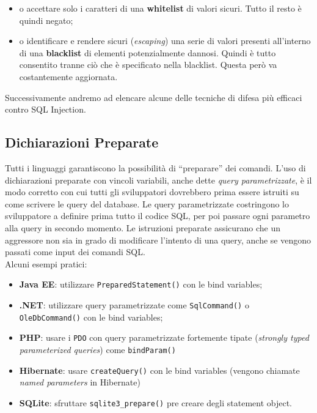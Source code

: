 \begin{itemize}
    \item o accettare solo i caratteri di una \textbf{whitelist} di valori sicuri.
          Tutto il resto è quindi negato;
    \item o identificare e rendere sicuri (\textit{escaping}) una serie di valori
          presenti all'interno di una \textbf{blacklist} di elementi
          potenzialmente dannosi. Quindi è
          tutto consentito tranne ciò che è specificato nella blacklist.
          Questa però va
          costantemente aggiornata.
\end{itemize}

Successivamente andremo ad elencare alcune delle tecniche di difesa più efficaci
contro SQL Injection.

\subsection{Dichiarazioni Preparate}

Tutti i linguaggi garantiscono la possibilità di “preparare” dei comandi.
L'uso di dichiarazioni preparate con vincoli variabili, anche dette
\textit{query parametrizzate}, è il
modo corretto con cui tutti gli sviluppatori dovrebbero prima essere istruiti su
come scrivere
le query del database.
Le query parametrizzate costringono lo sviluppatore a definire prima tutto il
codice SQL, per
poi passare ogni parametro alla query in secondo momento.
Le istruzioni preparate assicurano che un aggressore non sia in grado di
modificare l'intento
di una query, anche se vengono passati come input dei comandi SQL.\\

Alcuni esempi pratici:

\begin{itemize}
    \item \textbf{Java EE}:
          utilizzare  \verb|PreparedStatement()| con le bind variables;
    \item \textbf{.NET}:
          utilizzare query parametrizzate come \verb|SqlCommand()| o \verb|OleDbCommand()|
          con le bind variables;
    \item \textbf{PHP}: usare i \verb|PDO| con query parametrizzate fortemente tipate
          (\textit{strongly typed parameterized queries}) come \verb|bindParam()|
    \item \textbf{Hibernate}: usare \verb|createQuery()|
          con le bind variables (vengono chiamate \textit{named parameters}
          in Hibernate)
    \item \textbf{SQLite}: sfruttare \verb|sqlite3_prepare()|
          pre creare degli statement object.
\end{itemize}

